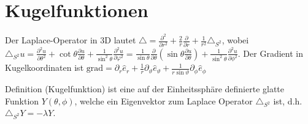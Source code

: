 
\section{Kugelfunktionen}

Der Laplace-Operator in 3D lautet $\triangle = \frac{\partial^2}{\partial r^2} + \frac2r\frac{\partial}{\partial r} + \frac1{r^2}\triangle_{S^2}$, wobei $\triangle_{S^2} u = \frac{\partial^2 u}{\partial\theta^2} + \cot \theta\frac{\partial u}{\partial\theta} + \frac1{\sin^2\theta}\frac{\partial^2u}{\partial\varphi^2} = \frac1{\sin\theta}\frac{\partial}{\partial\theta}\left(\sin\theta\frac{\partial u}{\partial\theta}\right) + \frac1{\sin^2\theta}\frac{\partial^2u}{\partial\phi^2}$. Der Gradient in Kugelkoordinaten ist $\mathrm{grad} = \partial_r\hat{e}_r + \frac{1}{r}\partial_\vartheta \hat{e}_\vartheta + \frac{1}{r\sin\vartheta}\partial_\phi\hat{e}_\phi$

\begin{namedtheorem}{Definition (Kugelfunktion)}
  ist eine auf der Einheitssphäre definierte glatte Funktion $Y(\theta,\phi)$, welche ein Eigenvektor zum Laplace Operator $\triangle_{S^2}$ ist, d.h. $\triangle_{S^2}Y = -\lambda Y$.
\end{namedtheorem}

